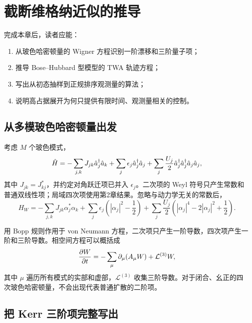 \chapter{截断维格纳近似的推导}
\label{ch:twa-derivation}

\begin{learningobjectives}
完成本章后，读者应能：
\begin{enumerate}
  \item 从玻色哈密顿量的 Wigner 方程识别一阶漂移和三阶量子项；
  \item 推导 Bose--Hubbard 型模型的 TWA 轨迹方程；
  \item 写出从初态抽样到正规排序观测量的算法；
  \item 说明高占据展开为何只提供有限时间、观测量相关的控制。
\end{enumerate}
\end{learningobjectives}

\section{从多模玻色哈密顿量出发}

考虑 $M$ 个玻色模式，
\begin{equation}
  \hat H=
  -\sum_{j,k}J_{jk}\hat a^{\dagger}_j\hat a_k
  +\sum_j\epsilon_j\hat a^{\dagger}_j\hat a_j
  +\sum_j\frac{U_j}{2}\hat a^{\dagger}_j\hat a^{\dagger}_j\hat a_j\hat a_j,
  \label{eq:bose-hubbard-general}
\end{equation}
其中 $J_{jk}=J_{kj}^*$，并约定对角跃迁项已并入 $\epsilon_j$。二次项的 Weyl 符号只产生常数和普通双线性项；局域四次项使用第2章结果。忽略与动力学无关的常数后，
\begin{equation}
  H_W=
  -\sum_{j,k}J_{jk}\alpha_j^*\alpha_k
  +\sum_j\epsilon_j\left(|\alpha_j|^2-\frac12\right)
  +\sum_j\frac{U_j}{2}
  \left(|\alpha_j|^4-2|\alpha_j|^2+\frac12\right).
  \label{eq:bose-hubbard-weyl}
\end{equation}

用 Bopp 规则作用于 von Neumann 方程，二次项只产生一阶导数，四次项产生一阶和三阶导数。相空间方程可以概括成
\begin{equation}
  \frac{\partial W}{\partial t}
  =-\sum_\mu\partial_\mu(A_\mu W)
  +\mathcal{L}^{(3)}W,
  \label{eq:wigner-first-third}
\end{equation}
其中 $\mu$ 遍历所有模式的实部和虚部，$\mathcal{L}^{(3)}$ 收集三阶导数。对于闭合、幺正的四次玻色哈密顿量，不会出现代表普通扩散的二阶项。

\section{把 Kerr 三阶项完整写出}

